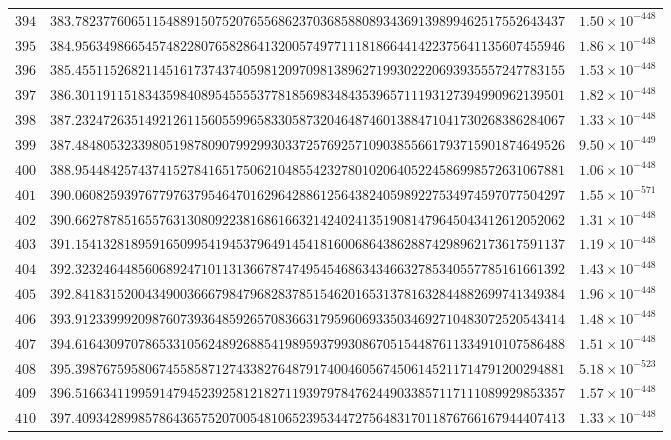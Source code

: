 \documentclass[12pt,reqno]{amsart}
\theoremstyle{remark}
\begin{document}
\begin{longtable}{clc}
$394$ & $383.7823776065115488915075207655686237036858808934369139899462517552643437$ & $1.50\times 10^{-448}$ \\
$395$ & $384.9563498665457482280765828641320057497711181866441422375641135607455946$ & $1.86\times 10^{-448}$ \\
$396$ & $385.4551152682114516173743740598120970981389627199302220693935557247783155$ & $1.53\times 10^{-448}$ \\
$397$ & $386.3011911518343598408954555537781856983484353965711193127394990962139501$ & $1.82\times 10^{-448}$ \\
$398$ & $387.2324726351492126115605599658330587320464874601388471041730268386284067$ & $1.33\times 10^{-448}$ \\
$399$ & $387.4848053233980519878090799299303372576925710903855661793715901874649526$ & $9.50\times 10^{-449}$ \\
$400$ & $388.9544842574374152784165175062104855423278010206405224586998572631067881$ & $1.06\times 10^{-448}$ \\
$401$ & $390.0608259397677976379546470162964288612564382405989227534974597077504297$ & $1.55\times 10^{-571}$ \\
$402$ & $390.6627878516557631308092238168616632142402413519081479645043412612052062$ & $1.31\times 10^{-448}$ \\
$403$ & $391.1541328189591650995419453796491454181600686438628874298962173617591137$ & $1.19\times 10^{-448}$ \\
$404$ & $392.3232464485606892471011313667874749545468634346632785340557785161661392$ & $1.43\times 10^{-448}$ \\
$405$ & $392.8418315200434900366679847968283785154620165313781632844882699741349384$ & $1.96\times 10^{-448}$ \\
$406$ & $393.9123399920987607393648592657083663179596069335034692710483072520543414$ & $1.48\times 10^{-448}$ \\
$407$ & $394.6164309707865331056248926885419895937993086705154487611334910107586488$ & $1.51\times 10^{-448}$ \\
$408$ & $395.3987675958067455858712743382764879174004605674506145211714791200294881$ & $5.18\times 10^{-523}$ \\
$409$ & $396.5166341199591479452392581218271193979784762449033857117111089929853357$ & $1.57\times 10^{-448}$ \\
$410$ & $397.4093428998578643657520700548106523953447275648317011876766167944407413$ & $1.33\times 10^{-448}$ \\

\end{longtable}
\end{document}
